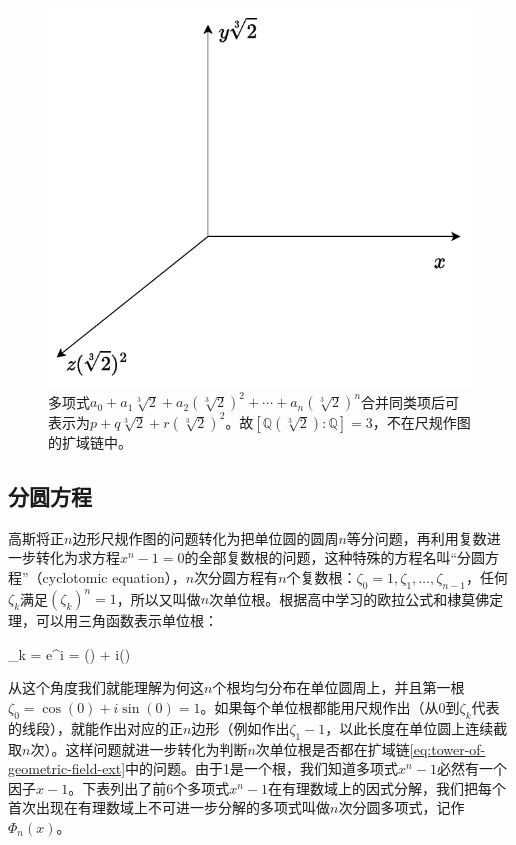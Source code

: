 \begin{figure}[htbp]
 \centering
 \includegraphics[scale=0.5]{../img/double-cube}
 \caption{多项式$a_0 + a_1\sqrt[3]{2} + a_2(\sqrt[3]{2})^2 + \dotsb + a_n(\sqrt[3]{2})^n$合并同类项后可表示为$p + q\sqrt[3]{2} + r(\sqrt[3]{2})^2$。故$[\mathbb{Q}(\sqrt[3]{2}) : \mathbb{Q}] = 3$，不在尺规作图的扩域链中。}
 \label{fig:double-cube}
\end{figure}

\subsection{分圆方程}
高斯将正$n$边形尺规作图的问题转化为把单位圆的圆周$n$等分问题，再利用复数进一步转化为求方程$x^n - 1 = 0$的全部复数根的问题，这种特殊的方程名叫“分圆方程”（cyclotomic equation），$n$次分圆方程有$n$个复数根：$\zeta_0 = 1, \zeta_1, \dotsc, \zeta_{n-1}$，任何$\zeta_k$满足$(\zeta_k)^n = 1$，所以又叫做$n$次单位根。根据高中学习的欧拉公式和棣莫佛定理，可以用三角函数表示单位根：

\be
\zeta_k = e^{i} = \cos() + i\sin()
\ee

从这个角度我们就能理解为何这$n$个根均匀分布在单位圆周上，并且第一根$\zeta_0 = \cos(0) + i\sin(0) = 1$。如果每个单位根都能用尺规作出（从0到$\zeta_k$代表的线段），就能作出对应的正$n$边形（例如作出$\zeta_1 - 1$，以此长度在单位圆上连续截取$n$次）。这样问题就进一步转化为判断$n$次单位根是否都在扩域链\cref{eq:tower-of-geometric-field-ext}中的问题。由于1是一个根，我们知道多项式$x^n - 1$必然有一个因子$x - 1$。下表列出了前6个多项式$x^n - 1$在有理数域上的因式分解，我们把每个首次出现在有理数域上不可进一步分解的多项式叫做$n$次分圆多项式，记作$\Phi_n(x)$。

